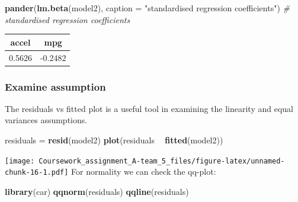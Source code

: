 \documentclass[]{article}
\newenvironment{Shaded}{\begin{snugshade}}{\end{snugshade}}
\newcommand{\KeywordTok}[1]{\textcolor[rgb]{0.13,0.29,0.53}{\textbf{#1}}}
\newcommand{\DataTypeTok}[1]{\textcolor[rgb]{0.13,0.29,0.53}{#1}}
\newcommand{\StringTok}[1]{\textcolor[rgb]{0.31,0.60,0.02}{#1}}
\newcommand{\CommentTok}[1]{\textcolor[rgb]{0.56,0.35,0.01}{\textit{#1}}}
\newcommand{\OperatorTok}[1]{\textcolor[rgb]{0.81,0.36,0.00}{\textbf{#1}}}
\newcommand{\NormalTok}[1]{#1}
\begin{document}
\begin{Shaded}
\begin{Highlighting}[]
\KeywordTok{pander}\NormalTok{(}\KeywordTok{lm.beta}\NormalTok{(model2),}
       \DataTypeTok{caption =} \StringTok{"standardised regression coefficients"}\NormalTok{) }\CommentTok{# standardised regression coefficients}
\end{Highlighting}
\end{Shaded}

\begin{longtable}[]{@{}cc@{}}
\toprule
\begin{minipage}[b]{0.12\columnwidth}\centering\strut
accel\strut
\end{minipage} & \begin{minipage}[b]{0.12\columnwidth}\centering\strut
mpg\strut
\end{minipage}\tabularnewline
\midrule
\endhead
\begin{minipage}[t]{0.12\columnwidth}\centering\strut
0.5626\strut
\end{minipage} & \begin{minipage}[t]{0.12\columnwidth}\centering\strut
-0.2482\strut
\end{minipage}\tabularnewline
\bottomrule
\end{longtable}

\subsubsection{Examine assumption}\label{examine-assumption}

The residuals vs fitted plot is a useful tool in examining the linearity
and equal variances assumptions.

\begin{Shaded}
\begin{Highlighting}[]
\NormalTok{residuals =}\StringTok{ }\KeywordTok{resid}\NormalTok{(model2)}
\KeywordTok{plot}\NormalTok{(residuals }\OperatorTok{~}\StringTok{ }\KeywordTok{fitted}\NormalTok{(model2))}
\end{Highlighting}
\end{Shaded}

\texttt{[image: Coursework\_assignment\_A-team\_5\_files/figure-latex/unnamed-chunk-16-1.pdf]}
For normality we can check the qq-plot:

\begin{Shaded}
\begin{Highlighting}[]
\KeywordTok{library}\NormalTok{(car)}
\KeywordTok{qqnorm}\NormalTok{(residuals)}
\KeywordTok{qqline}\NormalTok{(residuals)}
\end{Highlighting}
\end{Shaded}
\end{document}
